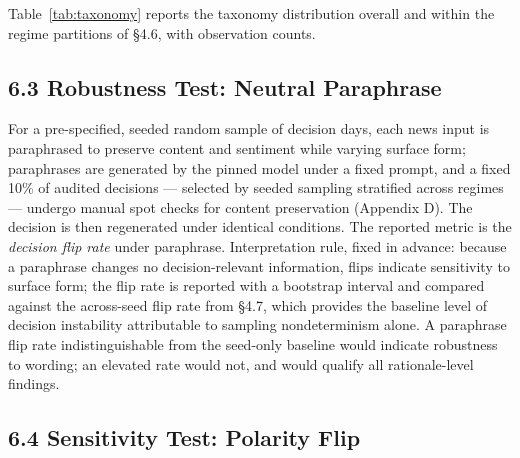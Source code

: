 \documentclass[
  12pt,
]{article}
\begin{document}
\begin{table}[H]
\centering
{}
\caption{Rationale-type prevalence, overall and by regime (placeholder; to be populated after experiments).}
\label{tab:taxonomy}
\end{table}

\noindent Table~\ref{tab:taxonomy}
reports the taxonomy distribution overall and within the regime
partitions of §4.6, with observation counts.

\hypertarget{robustness-test-neutral-paraphrase}{%
\subsection{6.3 Robustness Test: Neutral
Paraphrase}\label{robustness-test-neutral-paraphrase}}

For a pre-specified, seeded random sample of decision days, each news
input is paraphrased to preserve content and sentiment while varying
surface form; paraphrases are generated by the pinned model under a
fixed prompt, and a fixed 10\% of audited decisions --- selected by
seeded sampling stratified across regimes --- undergo manual spot checks
for content preservation (Appendix D). The decision is then regenerated
under identical conditions. The reported metric is the \emph{decision
flip rate} under paraphrase. Interpretation rule, fixed in advance:
because a paraphrase changes no decision-relevant information, flips
indicate sensitivity to surface form; the flip rate is reported with a
bootstrap interval and compared against the across-seed flip rate from
§4.7, which provides the baseline level of decision instability
attributable to sampling nondeterminism alone. A paraphrase flip rate
indistinguishable from the seed-only baseline would indicate robustness
to wording; an elevated rate would not, and would qualify all
rationale-level findings.

\hypertarget{sensitivity-test-polarity-flip}{%
\subsection{6.4 Sensitivity Test: Polarity
Flip}\label{sensitivity-test-polarity-flip}}
\end{document}
